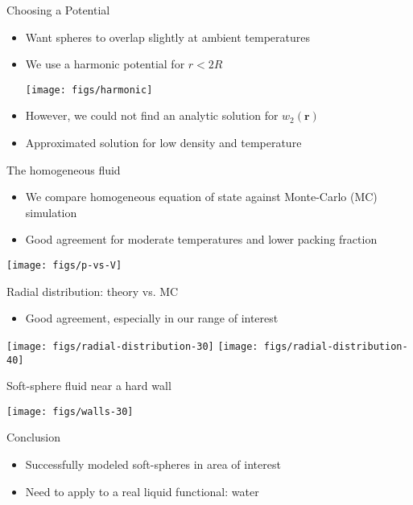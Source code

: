 \documentclass{beamer}
\newcommand{\rr}{\textbf{r}}
\begin{document}
\begin{frame}{Choosing a Potential}
 \begin{itemize}
   \item Want spheres to overlap slightly at ambient temperatures
   \item We use a harmonic potential for $r < 2R$
     \begin{center}
       \texttt{[image: figs/harmonic]}
     \end{center}
   \item However, we could not find an analytic solution for $w_2(\rr)$
   \item Approximated solution for low density and temperature
 \end{itemize}
\end{frame}

\begin{frame}{The homogeneous fluid}
  \begin{itemize}
    \item We compare homogeneous equation of state against Monte-Carlo
      (MC) simulation
    \item Good agreement for moderate temperatures and lower
      packing fraction
  \end{itemize}
  \begin{center}
    \texttt{[image: figs/p-vs-V]}
  \end{center}
\end{frame}

\begin{frame}{Radial distribution: theory vs. MC}
  \begin{itemize}
  \item Good agreement, especially in our range of interest
  \end{itemize}
  \begin{center}
    \texttt{[image: figs/radial-distribution-30]}
    \texttt{[image: figs/radial-distribution-40]}
  \end{center}
\end{frame}

\begin{frame}{Soft-sphere fluid near a hard wall}
  \begin{center}
    \texttt{[image: figs/walls-30]}
  \end{center}
\end{frame}

\begin{frame}{Conclusion}
  \begin{itemize}
    \item Successfully modeled soft-spheres in area of interest
    \item Need to apply to a real liquid functional: water
  \end{itemize}
\end{frame}
\end{document}
